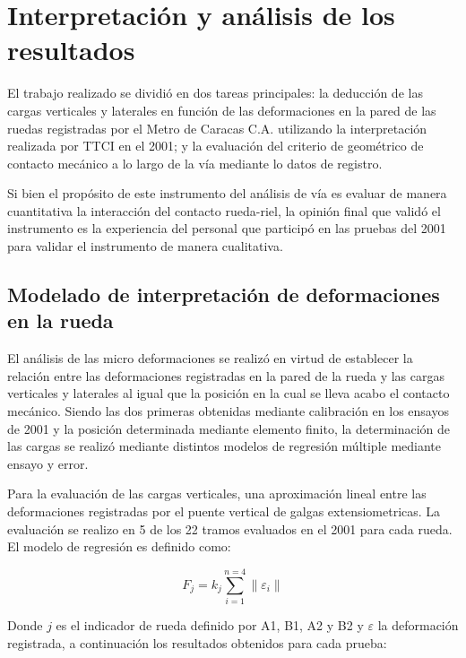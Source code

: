 \documentclass[main]{subfiles}
\begin{document}
\chapter{Interpretación y análisis de los resultados}

El trabajo realizado se dividió en dos tareas principales: la deducción de las cargas verticales y laterales en función de las deformaciones en la pared de las ruedas registradas por el Metro de Caracas C.A. utilizando la interpretación realizada por TTCI en el 2001; y la evaluación del criterio de geométrico de contacto mecánico a lo largo de la vía mediante lo datos de registro.

Si bien el propósito de este instrumento del análisis de vía es evaluar de manera cuantitativa la interacción del contacto rueda-riel, la opinión final que validó el instrumento es la experiencia del personal que participó en las pruebas del 2001 para validar el instrumento de manera cualitativa.

\section{Modelado de interpretación de deformaciones en la rueda}

El análisis de las micro deformaciones se realizó en virtud de establecer la relación entre las deformaciones registradas en la pared de la rueda y las cargas verticales y laterales al igual que la posición en la cual se lleva acabo el contacto mecánico. Siendo las dos primeras obtenidas mediante calibración en los ensayos de 2001 y la posición determinada mediante elemento finito, la determinación de las cargas se realizó mediante distintos modelos de regresión múltiple mediante ensayo y error.

Para la evaluación de las cargas verticales, una aproximación lineal entre las deformaciones registradas por el puente vertical de galgas extensiometricas. La evaluación se realizo en 5 de los 22 tramos evaluados en el 2001 para cada rueda. El modelo de regresión es definido como:

\begin{equation}
F_j=k_j \sum_{i=1}^{n=4}\|\varepsilon_i\|
\end{equation}

Donde $j$ es el indicador de rueda definido por A1, B1, A2 y B2 y $\varepsilon$ la deformación registrada, a continuación los resultados obtenidos para cada prueba:
\end{document}
